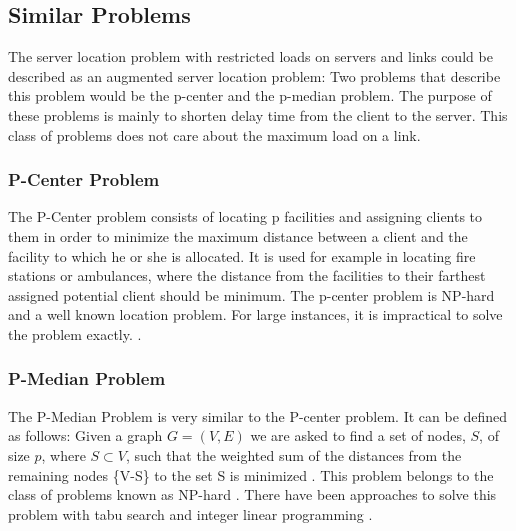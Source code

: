 \documentclass [12pt]{article}
\begin{document}
\subsection {Similar Problems}
The server location problem with restricted loads on servers and links could be described as an augmented server location problem: 
Two problems that describe this problem would be the p-center and the
p-median problem. The purpose of these problems is mainly to shorten delay
time from the client to the server. 
This class of problems does not care about the maximum load on a link.

\subsubsection {P-Center Problem}
The P-Center problem consists of locating p facilities and assigning clients
to them in order to minimize the maximum distance between a client and the facility
to which he or she is allocated. It is used for example in locating fire stations or ambulances,
where the distance from the facilities 
to their farthest assigned potential client should be minimum.
The p-center problem is NP-hard and a well known location problem.
For large instances, it is impractical to solve the problem exactly.
\cite{KarivHakimi1979}.

\subsubsection {P-Median Problem}
The P-Median Problem is very similar to the P-center problem. It can be defined as follows:
Given a graph $G=(V,E)$ we are asked to find a set of nodes, $S$, of size $p$, where $ S\subset V$, such that the weighted
sum of the distances from the remaining nodes \{V-S\} to the set S is minimized \cite{Rolland1997329}.
This problem belongs to the class of problems known as NP-hard \cite{KarivHakimi1979median}. There have been
approaches to solve this problem with tabu search \cite{Rolland1997329} and integer linear programming 
\cite{rosing1979p}.


\end{document}

